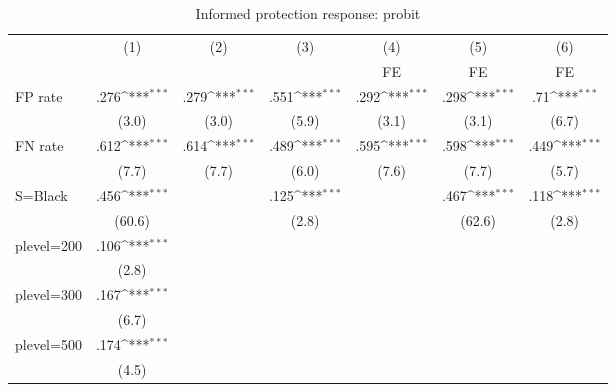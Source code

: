 \begin{table}[htbp]\centering
\def\sym#1{\ifmmode^{#1}\else\(^{#1}\)\fi}
\caption{Informed protection response: probit}
\begin{tabular}{l*{6}{c}}
\hline\hline
                &\multicolumn{1}{c}{(1)}&\multicolumn{1}{c}{(2)}&\multicolumn{1}{c}{(3)}&\multicolumn{1}{c}{(4)}&\multicolumn{1}{c}{(5)}&\multicolumn{1}{c}{(6)}\\
                &\multicolumn{1}{c}{}&\multicolumn{1}{c}{}&\multicolumn{1}{c}{}&\multicolumn{1}{c}{FE}&\multicolumn{1}{c}{FE}&\multicolumn{1}{c}{FE}\\
\hline
FP rate         &     .276\sym{***}&     .279\sym{***}&     .551\sym{***}&     .292\sym{***}&     .298\sym{***}&      .71\sym{***}\\
                &    (3.0)         &    (3.0)         &    (5.9)         &    (3.1)         &    (3.1)         &    (6.7)         \\
FN rate         &     .612\sym{***}&     .614\sym{***}&     .489\sym{***}&     .595\sym{***}&     .598\sym{***}&     .449\sym{***}\\
                &    (7.7)         &    (7.7)         &    (6.0)         &    (7.6)         &    (7.7)         &    (5.7)         \\
S=Black         &     .456\sym{***}&                  &     .125\sym{***}&                  &     .467\sym{***}&     .118\sym{***}\\
                &   (60.6)         &                  &    (2.8)         &                  &   (62.6)         &    (2.8)         \\
plevel=200      &     .106\sym{***}&                  &                  &                  &                  &                  \\
                &    (2.8)         &                  &                  &                  &                  &                  \\
plevel=300      &     .167\sym{***}&                  &                  &                  &                  &                  \\
                &    (6.7)         &                  &                  &                  &                  &                  \\
plevel=500      &     .174\sym{***}&                  &                  &                  &                  &                  \\
                &    (4.5)         &                  &                  &                  &                  &                  \\

\end{tabular}
\end{table}
